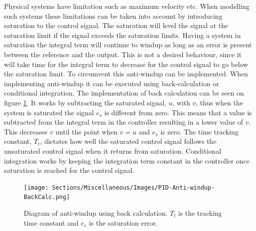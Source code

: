 \documentclass[../../main.tex]{subfiles}
\begin{document}

Physical systems have limitation such as maximum velocity etc. When modelling such systems these limitations can be taken into account by introducing saturation to the control signal. The saturation will level the signal at the saturation limit if the signal exceeds the saturation limits. Having a system in saturation the integral term will continue to windup as long as an error is present between the reference and the output. This is not a desired behaviour, since it will take time for the integral term to decrease for the control signal to go below the saturation limit. To circumvent this anti-windup can be implemented. %
When implementing anti-windup it can be executed using back-calculation or conditional integration. The implementation of back calculation can be seen on figure \ref{fig:anti-windup}. It works by subtracting the saturated signal, $u$, with $v$, thus when the system is saturated the signal $e_s$ is different from zero. This means that a value is subtracted from the integral term in the controller resulting in a lower value of $v$. This decreases $v$ until the point when $v=u$ and $e_s$ is zero. The time tracking constant, $T_t$, dictates how well the saturated control signal follows the unsaturated control signal when it returns from saturation. Conditional integration works by keeping the integration term constant in the controller once saturation is reached for the control signal. 

\begin{figure}
    \centering
    \texttt{[image: Sections/Miscellaneous/Images/PID-Anti-windup-BackCalc.png]}
    \caption{Diagram of anti-windup using back calculation. $T_t$ is the tracking time constant and $e_s$ is the saturation error.}
    \label{fig:anti-windup}
\end{figure}
\end{document}
